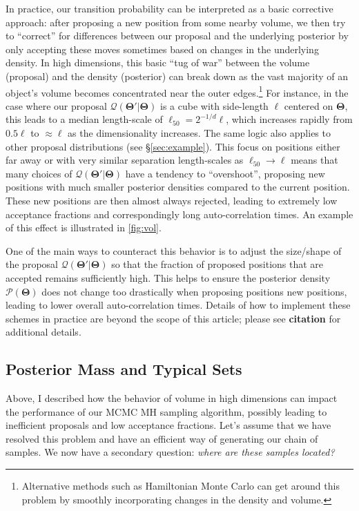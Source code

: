 \documentclass[12pt, titlepage]{article}
\newcommand{\params}{\ensuremath{\boldsymbol\Theta}}
\newcommand{\posterior}{\ensuremath{\mathcal{P}}}
\newcommand{\proposal}{\ensuremath{\mathcal{Q}}}
\begin{document}
In practice, our transition probability can be interpreted as
a basic corrective approach: after proposing
a new position from some nearby volume, we then try to ``correct''
for differences between our proposal and the underlying posterior
by only accepting these moves sometimes based on changes in the underlying density.
In high dimensions, this basic ``tug of war'' between the volume (proposal) and
the density (posterior) can break down as the vast majority of an object's 
volume becomes concentrated near the outer edges.\footnote{Alternative
methods such as Hamiltonian Monte Carlo \citep{neal12} can get around
this problem by smoothly incorporating changes in the density and volume.}
For instance, in the case where our
proposal $\proposal(\params'|\params)$ is a cube with side-length $\ell$
centered on $\params$, this leads to a median length-scale of
$\ell_{50} = 2^{-1/d} \ell$, which increases rapidly from $0.5 \ell$
to $\approx \ell$ as the dimensionality increases. The same logic
also applies to other proposal distributions (see \S\ref{sec:example}).
This focus on positions either far away or with very similar separation
length-scales as $\ell_{50} \rightarrow \ell$ 
means that many choices of $\proposal(\params'|\params)$
have a tendency to ``overshoot'', proposing new positions with much
smaller posterior densities compared to the current position. These
new positions are then almost always rejected, leading to extremely
low acceptance fractions and correspondingly
long auto-correlation times. An example of this effect is
illustrated in {\color{red} \autoref{fig:vol}.}

One of the main ways to counteract this behavior is to
adjust the size/shape of the proposal $\proposal(\params'|\params)$
so that the fraction of proposed positions that are accepted remains
sufficiently high. This helps to ensure the posterior density 
$\posterior(\params)$ does not change too drastically when proposing 
positions new positions, leading to lower overall auto-correlation times.
Details of how to implement these schemes in practice are beyond 
the scope of this article; please see
\textbf{citation} for additional details.

\subsection{Posterior Mass and Typical Sets} \label{subsec:mass}

Above, I described how the behavior of volume in high dimensions
can impact the performance of our MCMC MH sampling algorithm,
possibly leading to inefficient proposals and 
low acceptance fractions. Let's assume that we have resolved this
problem and have an efficient way of generating our chain
of samples. We now have a secondary question: \textit{where are these
samples located?}
\end{document}
